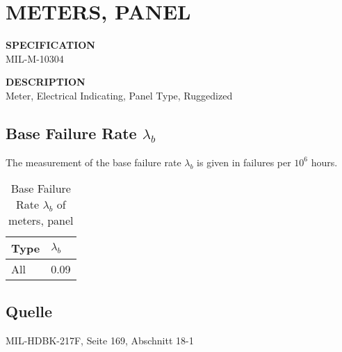 \section{METERS, PANEL}

\begin{minipage}[t]{0.29\textwidth}
    \textbf{SPECIFICATION}\\
    MIL-M-10304
\end{minipage}
\begin{minipage}[t]{0.7\textwidth}
    \textbf{DESCRIPTION}\\
    Meter, Electrical Indicating, Panel Type, Ruggedized
\end{minipage}

\subsection{Base Failure Rate $\lambda_b$}
The measurement of the base failure rate $\lambda_b$ is given in failures per $10^6$ hours.
\begin{table}[ht]
{\centering

\begin{tabular}{|p{5cm}|p{5cm}|}
    \hline
    \textbf{Type} & \textbf{$\lambda_b$} \\
    \hline
    All & 0.09 \\
    \hline
\end{tabular}

\caption{Base Failure Rate $\lambda_b$ of meters, panel}

\label{tab:bfr_meters_panel}
\par}
\end{table}
\subsection*{Quelle}
MIL-HDBK-217F, Seite 169, Abschnitt 18-1